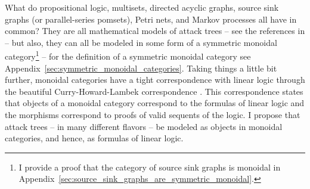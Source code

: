 \documentclass{sigplanconf}
\begin{document}
What do propositional logic, multisets, directed acyclic graphs,
source sink graphs (or parallel-series pomsets), Petri nets, and
Markov processes all have in common?  They are all mathematical models
of attack trees -- see the references in
\cite{Kordy:2014a,Jhawar:2015} -- but also, they can all be modeled in
some form of a symmetric monoidal category\footnote{I provide a proof
  that the category of source sink graphs is monoidal in
  Appendix~\ref{sec:source_sink_graphs_are_symmetric_monoidal}.}
\cite{Tzouvaras:1998,Brown:1991,Fiore:2013,FrancescoAlbasini2010} --
for the definition of a symmetric monoidal category see
Appendix~\ref{sec:symmetric_monoidal_categories}.  Taking things a
little bit further, monoidal categories have a tight correspondence
with linear logic through the beautiful Curry-Howard-Lambek
correspondence \cite{MSC:4439568}.  This correspondence states that
objects of a monoidal category correspond to the formulas of linear
logic and the morphisms correspond to proofs of valid sequents of the
logic.  I propose that attack trees -- in many different flavors -- be
modeled as objects in monoidal categories, and hence, as formulas of
linear logic.
\end{document}
